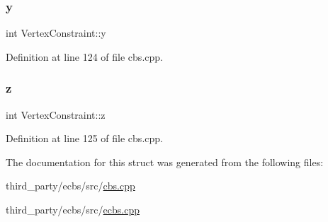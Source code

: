 \subsubsection{\texorpdfstring{y}{y}}
{\footnotesize\ttfamily int Vertex\+Constraint\+::y}



Definition at line 124 of file cbs.\+cpp.

\mbox{\label{struct_vertex_constraint_a57867ee08f9c72a86684ea759693011f}} 
\subsubsection{\texorpdfstring{z}{z}}
{\footnotesize\ttfamily int Vertex\+Constraint\+::z}



Definition at line 125 of file cbs.\+cpp.



The documentation for this struct was generated from the following files\+:\begin{DoxyCompactItemize}
\item 
third\+\_\+party/ecbs/src/\hyperlink{cbs_8cpp}{cbs.\+cpp}\item 
third\+\_\+party/ecbs/src/\hyperlink{ecbs_8cpp}{ecbs.\+cpp}\end{DoxyCompactItemize}
